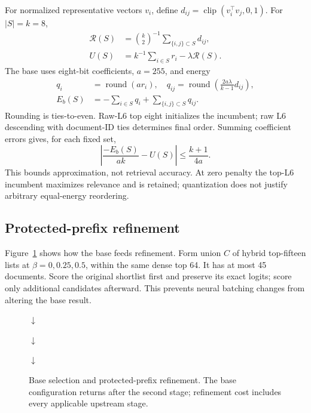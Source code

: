 \documentclass[conference]{IEEEtran}
\newcommand{\red}{\mathcal{R}}
\begin{document}
For normalized representative vectors \(v_i\), define \(d_{ij}=\operatorname{clip}(v_i^\top v_j,0,1)\). For \(|S|=k=8\),
\begin{align}
\red(S)&=\binom{k}{2}^{-1}\sum_{\{i,j\}\subset S}d_{ij},\label{eq:red}\\
U(S)&=k^{-1}\sum_{i\in S}r_i-\lambda\red(S).\label{eq:utility}
\end{align}
The base uses eight-bit coefficients, \(a=255\), and energy
\begin{align}
q_i&=\operatorname{round}(ar_i),\quad
q_{ij}=\operatorname{round}\!\left(\frac{2a\lambda}{k-1}d_{ij}\right),\\
E_b(S)&=-\sum_{i\in S}q_i+\sum_{\{i,j\}\subset S}q_{ij}.\label{eq:base_energy}
\end{align}
Rounding is ties-to-even. Raw-L6 top eight initializes the incumbent; raw L6 descending with document-ID ties determines final order. Summing coefficient errors gives, for each fixed set,
\begin{equation}
\left|\frac{-E_b(S)}{ak}-U(S)\right|\leq\frac{k+1}{4a}.\label{eq:base_bound}
\end{equation}
This bounds approximation, not retrieval accuracy. At zero penalty the top-L6 incumbent maximizes relevance and is retained; quantization does not justify arbitrary equal-energy reordering.

\subsection{Protected-prefix refinement}
Figure~\ref{fig:pipeline} shows how the base feeds refinement. Form union \(C\) of hybrid top-fifteen lists at \(\beta=0,0.25,0.5\), within the same dense top 64. It has at most 45 documents. Score the original shortlist first and preserve its exact logits; score only additional candidates afterward. This prevents neural batching changes from altering the base result.

\begin{figure}[t]
\centering
{}
\par\smallskip$\downarrow$\par\smallskip
{}
\par\smallskip$\downarrow$\par\smallskip
{}
\par\smallskip$\downarrow$\par\smallskip
{}
\caption{Base selection and protected-prefix refinement. The base configuration returns after the second stage; refinement cost includes every applicable upstream stage.}
\label{fig:pipeline}
\end{figure}
\end{document}
